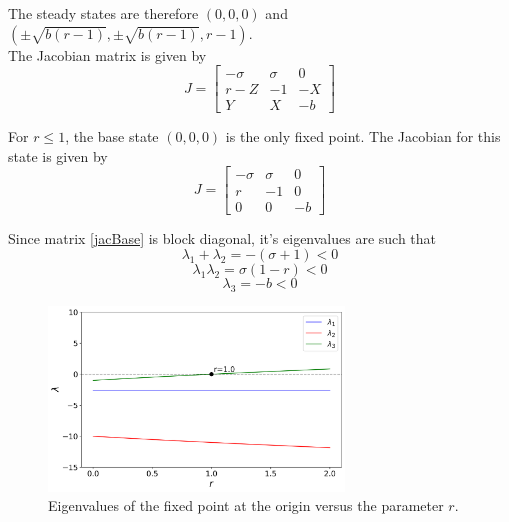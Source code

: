 \documentclass[paper=a4, fontsize=11pt]{scrartcl}
\numberwithin{equation}{section}		%
\numberwithin{figure}{section}			%
\numberwithin{table}{section}				%
\begin{document}
\noindent The steady states are therefore $(0,0,0)$ and $(\pm \sqrt{b(r-1)}, \pm \sqrt{b(r-1)}, r-1)$.\\

\noindent The Jacobian matrix is given by 
\begin{equation}
	J =
	\begin{bmatrix}
		-\sigma & \sigma & 0 \\
		r - Z & -1 & -X \\
		Y & X & -b
	\end{bmatrix}
\end{equation}

\noindent For $r \leq 1$, the base state $(0,0,0)$ is the only fixed point. The Jacobian for this state is given by 
\begin{equation}
	J =
	\begin{bmatrix}
		-\sigma & \sigma & 0 \\
		r  & -1 & 0 \\
		0 & 0 & -b
	\end{bmatrix}
	\label{jacBase}
\end{equation}

\noindent Since matrix \ref{jacBase} is block diagonal, it's eigenvalues are such that 
\begin{equation}
	\lambda_1 + \lambda_2 = - (\sigma + 1) < 0
\end{equation}
\begin{equation}
	\lambda_1 \lambda_2 = \sigma (1-r) < 0
\end{equation}
\begin{equation}
	\lambda_3 = -b < 0
\end{equation}


\begin{figure}[hbt!]
	\centering
	\includegraphics[width=0.7\textwidth]{media/pitchfork_eigs.png}
	\caption{Eigenvalues of the fixed point at the origin versus the parameter $r$.}
	\label{fig:origineigs}
\end{figure}
\end{document}

